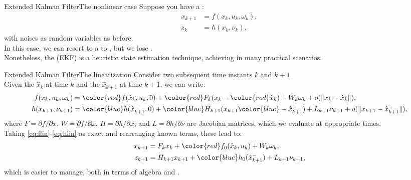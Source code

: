 \begin{frame}{Extended Kalman Filter}{The nonlinear case}
  Suppose you have a :
  \begin{subequations}
    \begin{align}
      x_{k+1} &= f(x_k,u_k,\omega_k),\\
      z_k &= h(x_k,\nu_k),
    \end{align}
  \end{subequations}
  with noises as random variables as before.\\
  In this case, we can resort to a  to , but we lose .\\
  Nonetheless, the  (EKF) is a  heuristic state estimation technique, achieving  in many practical scenarios.
\end{frame}
\begin{frame}{Extended Kalman Filter}{The linearization}
  Consider two subsequent time instants $k$ and $k+1$.\\
  Given the  $\hat{x}_k$ at time $k$ and the  $\hat{x}_{k+1}^{-}$ at time $k+1$, we can write:
  \begin{subequations}
    \begin{align}
      f(x_k,u_k,\omega_k) &= {\color{red}f(\hat{x}_k,u_k,0)} + {\color{red}F_k}(x_k - {\color{red}\hat{x}_k}) + W_k\omega_k + o(\|x_k - \hat{x}_k\|),\label{eq:flin}\\
      h(x_{k+1},\nu_{k+1}) &= {\color{blue}h(\hat{x}_{k+1}^{-},0)} + {\color{blue}H_{k+1}}(x_{k+1} {\color{blue}- \hat{x}_{k+1}^{-}}) + L_{k+1}\nu_{k+1} + o(\|x_{k+1} - \hat{x}_{k+1}^{-}\|),\label{eq:hlin}
    \end{align}
  \end{subequations}
  where $F=\partial f/\partial x$, $W=\partial f/\partial \omega$, $H=\partial h/\partial x$, and $L=\partial h/\partial \nu$ are Jacobian matrices, which we evaluate at appropriate times.\\
  Taking \eqref{eq:flin}-\eqref{eq:hlin} as exact and rearranging known terms, these lead to:
  \begin{subequations}
    \begin{align}
      x_{k+1} &= F_k x_k + {\color{red}f_0(\hat{x}_k,u_k)} + W_k\omega_k,\\
      z_{k+1} &= H_{k+1}x_{k+1} + {\color{blue}h_0(\hat{x}_{k+1}^{-})} + L_{k+1}\nu_{k+1},\label{eq:newmeas}
    \end{align}
  \end{subequations}
  which is easier to manage, both in terms of algebra and .
\end{frame}
